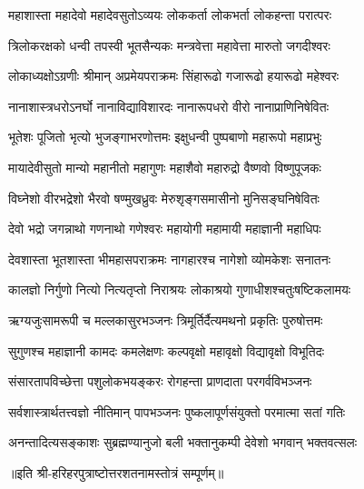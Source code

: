 

\twolineshloka
{महाशास्ता महादेवो महादेवसुतोऽव्ययः}
{लोककर्ता लोकभर्ता लोकहन्ता परात्परः}

\twolineshloka
{त्रिलोकरक्षको धन्वी तपस्वी भूतसैन्यकः}
{मन्त्रवेत्ता महावेत्ता मारुतो जगदीश्वरः}

\twolineshloka
{लोकाध्यक्षोऽग्रणीः श्रीमान् अप्रमेयपराक्रमः}
{सिंहारूढो गजारूढो हयारूढो महेश्वरः}

\twolineshloka
{नानाशास्त्रधरोऽनर्घो नानाविद्याविशारदः}
{नानारूपधरो वीरो नानाप्राणिनिषेवितः}

\twolineshloka
{भूतेशः पूजितो भृत्यो भुजङ्गाभरणोत्तमः}
{इक्षुधन्वी पुष्पबाणो महारूपो महाप्रभुः}

\twolineshloka
{मायादेवीसुतो मान्यो महानीतो महागुणः}
{महाशैवो महारुद्रो वैष्णवो विष्णुपूजकः}

\twolineshloka
{विघ्नेशो वीरभद्रेशो भैरवो षण्मुखध्रुवः}
{मेरुशृङ्गसमासीनो मुनिसङ्घनिषेवितः}

\twolineshloka
{देवो भद्रो जगन्नाथो गणनाथो गणेश्वरः}
{महायोगी महामायी महाज्ञानी महाधिपः}

\twolineshloka
{देवशास्ता भूतशास्ता भीमहासपराक्रमः}
{नागहारश्च नागेशो व्योमकेशः सनातनः}

\twolineshloka
{कालज्ञो निर्गुणो नित्यो नित्यतृप्तो निराश्रयः}
{लोकाश्रयो गुणाधीशश्चतुःषष्टिकलामयः}

\twolineshloka
{ऋग्यजुःसामरूपी च मल्लकासुरभञ्जनः}
{त्रिमूर्तिर्दैत्यमथनो प्रकृतिः पुरुषोत्तमः}

\twolineshloka
{सुगुणश्च महाज्ञानी कामदः कमलेक्षणः}
{कल्पवृक्षो महावृक्षो विद्यावृक्षो विभूतिदः}

\twolineshloka
{संसारतापविच्छेत्ता पशुलोकभयङ्करः}
{रोगहन्ता प्राणदाता परगर्वविभञ्जनः}

\twolineshloka
{सर्वशास्त्रार्थतत्त्वज्ञो नीतिमान् पापभञ्जनः}
{पुष्कलापूर्णसंयुक्तो परमात्मा सतां गतिः}

\twolineshloka
{अनन्तादित्यसङ्काशः सुब्रह्मण्यानुजो बली}
{भक्तानुकम्पी देवेशो भगवान् भक्तवत्सलः}

{॥इति श्री-हरिहरपुत्राष्टोत्तरशतनामस्तोत्रं सम्पूर्णम्॥}
